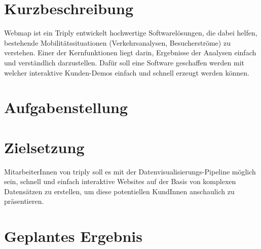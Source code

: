 \section{Kurzbeschreibung}
Webmap ist ein 
Triply entwickelt hochwertige Softwarelösungen, die dabei helfen, bestehende Mobilitätssituationen (Verkehrsanalysen, Besucherströme) zu verstehen. Einer der Kernfunktionen liegt darin, Ergebnisse der Analysen einfach und verständlich darzustellen. Dafür soll eine Software geschaffen werden mit welcher interaktive Kunden-Demos einfach und schnell erzeugt werden können.

\section{Aufgabenstellung}

\section{Zielsetzung}
MitarbeiterInnen von triply soll es mit der Datenvisualisierungs-Pipeline möglich sein, schnell und einfach interaktive Websites auf der Basis von komplexen Datensätzen zu erstellen, um diese potentiellen KundInnen anschaulich zu präsentieren.

\section{Geplantes Ergebnis}
